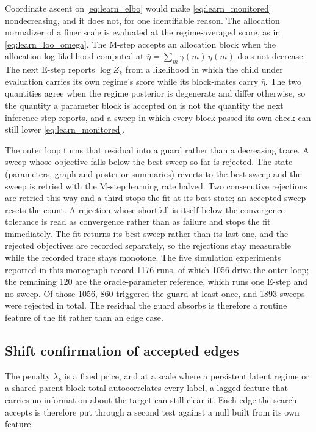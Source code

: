 Coordinate ascent on \cref{eq:learn_elbo} would make \cref{eq:learn_monitored} nondecreasing, and
it does not, for one identifiable reason. The allocation normalizer of a finer scale is evaluated
at the regime-averaged score, as in \cref{eq:learn_loo_omega}. The M-step accepts an allocation
block when the allocation log-likelihood computed at
$\bar{\eta} = \sum_m \gamma(m)\,\eta(m)$ does not decrease. The next E-step reports $\log Z_k$
from a likelihood in which the child under evaluation carries its own regime's score while its
block-mates carry $\bar{\eta}$. The two quantities agree when the regime posterior is degenerate
and differ otherwise, so the quantity a parameter block is accepted on is not the quantity the
next inference step reports, and a sweep in which every block passed its own check can still lower
\cref{eq:learn_monitored}.

The outer loop turns that residual into a guard rather than a decreasing trace. A sweep whose
objective falls below the best sweep so far is rejected. The state (parameters, graph and
posterior summaries) reverts to the best sweep and the sweep is retried with the M-step learning
rate halved. Two consecutive rejections are retried this way and a third stops the fit at its best
state; an accepted sweep resets the count. A rejection whose
shortfall is itself below the convergence tolerance is read as convergence rather than as failure
and stops the fit immediately. The fit returns its best sweep rather than its last one, and the
rejected objectives are recorded separately, so the rejections stay measurable while the recorded
trace stays monotone. The five simulation experiments reported in this monograph record 1176 runs,
of which 1056 drive the outer loop; the remaining 120 are the oracle-parameter reference, which
runs one E-step and no sweep. Of those 1056, 860 triggered the guard at least once, and 1893
sweeps were rejected in total. The residual the guard absorbs is therefore a routine feature of
the fit rather than an edge case.

\subsection{Shift confirmation of accepted edges}
\label{sec:learning:confirm}

The penalty $\lambda_k$ is a fixed price, and at a scale where a persistent latent regime or a
shared parent-block total autocorrelates every label, a lagged feature that carries no information
about the target can still clear it. Each edge the search accepts is therefore put through a
second test against a null built from its own feature.

